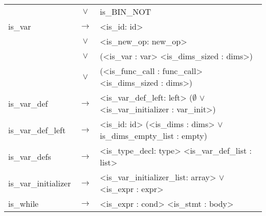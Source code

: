 \documentclass[a4paper]{article}
\begin{document}
\begin{tabular}{lcl}
								& $\vee$ & is\_BIN\_NOT \\
	is\_var					 	& $\to$ & <is\_id: id> \\
								& $\vee$ & <is\_new\_op: new\_op> \\
								& $\vee$ & (<is\_var : var> <is\_dims\_sized : dims>) \\
								& $\vee$ & (<is\_func\_call : func\_call> <is\_dims\_sized : dims>) \\
	is\_var\_def			 	& $\to$ & <is\_var\_def\_left: left> ($\emptyset$ $\vee$ <is\_var\_initializer : var\_init>) \\
	is\_var\_def\_left		 	& $\to$ & <is\_id: id> (<is\_dims : dims> $\vee$ is\_dims\_empty\_list : empty) \\
	is\_var\_defs		 		& $\to$ & <is\_type\_decl: type> <is\_var\_def\_list : list> \\
	is\_var\_initializer 		& $\to$ & <is\_var\_initializer\_list: array> $\vee$ <is\_expr : expr> \\
	is\_while 					& $\to$ & <is\_expr : cond> <is\_stmt : body> \\
\end{tabular}
\end{document}
